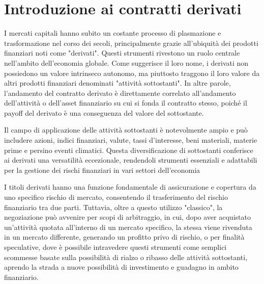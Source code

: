 \documentclass[12pt,a4paper]{report}
\begin{document}
\restoregeometry



\newpage
\mbox{}
\newpage

\tableofcontents
\clearpage %





\chapter{Introduzione ai contratti derivati}


I mercati capitali hanno subito un costante processo di plasmazione e trasformazione nel corso dei secoli, principalmente grazie all'ubiquità dei prodotti finanziari noti come "derivati". Questi strumenti rivestono un ruolo centrale nell'ambito dell'economia globale. Come suggerisce il loro nome, i derivati non possiedono un valore intrinseco autonomo, ma piuttosto traggono il loro valore da altri prodotti finanziari denominati "attività sottostanti". In altre parole, l'andamento del contratto derivato è direttamente correlato all'andamento dell'attività o dell'asset finanziario su cui si fonda il contratto stesso, poiché il payoff del derivato è una conseguenza del valore del sottostante.

Il campo di applicazione delle attività sottostanti è notevolmente ampio e può includere azioni, indici finanziari, valute, tassi d'interesse, beni materiali, materie prime e persino eventi climatici. Questa diversificazione di sottostanti conferisce ai derivati una versatilità eccezionale, rendendoli strumenti essenziali e adattabili per la gestione dei rischi finanziari in vari settori dell'economia

I titoli derivati hanno una funzione fondamentale di assicurazione e copertura da uno specifico rischio di mercato, consentendo il trasferimento del rischio finanziario tra due parti. Tuttavia, oltre a questo utilizzo "classico", la negoziazione può avvenire per scopi di arbitraggio, in cui, dopo aver acquistato un'attività quotata all'interno di un mercato specifico, la stessa viene rivenduta in un mercato differente, generando un profitto privo di rischio, o per finalità speculative, dove è possibile intravedere questi strumenti come semplici scommesse basate sulla possibilità di rialzo o ribasso delle attività sottostanti, aprendo la strada a nuove possibilità di investimento e guadagno in ambito finanziario.
\end{document}
